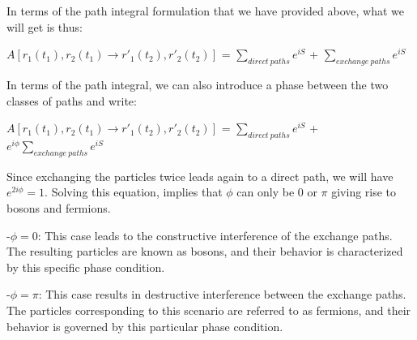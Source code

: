 \documentclass[12pt]{report}
\begin{document}
\begin{minipage}{1 \textwidth}
		In terms of the path integral formulation that we have provided above, what we will get is thus:
		
		\begin{center}
			$A[r_1(t_1),r_2(t_1) \rightarrow r'_1(t_2),r'_2(t_2)]$ = $\sum_{direct \ paths} e^{iS}$ + $\sum_{exchange \ paths} e^{iS}$
		\end{center}
		
		In terms of the path integral, we can also introduce a phase
		between the two classes of paths and write: 
		
		\begin{center}
			$A[r_1(t_1),r_2(t_1) \rightarrow r'_1(t_2),r'_2(t_2)]$ = $\sum_{direct \ paths} e^{iS}$ + $e^{i \phi} \sum_{exchange \ paths} e^{iS}$
		\end{center}
		
		Since exchanging the particles twice leads again to a direct path, we will have $e^{2i \phi} = 1$. Solving this equation, implies that $\phi$ can only be 0 or $\pi$ giving rise to bosons and fermions. \newline	
		
		-$\phi = 0$: This case leads to the constructive interference of the exchange paths. The resulting particles are known as bosons, and their behavior is characterized by this specific phase condition.\newline
		
		-$\phi = \pi$: This case results in destructive interference between the exchange paths. The particles corresponding to this scenario are referred to as fermions, and their behavior is governed by this particular phase condition.\newline
		
		
		
	\end{minipage}
	
\end{document}
